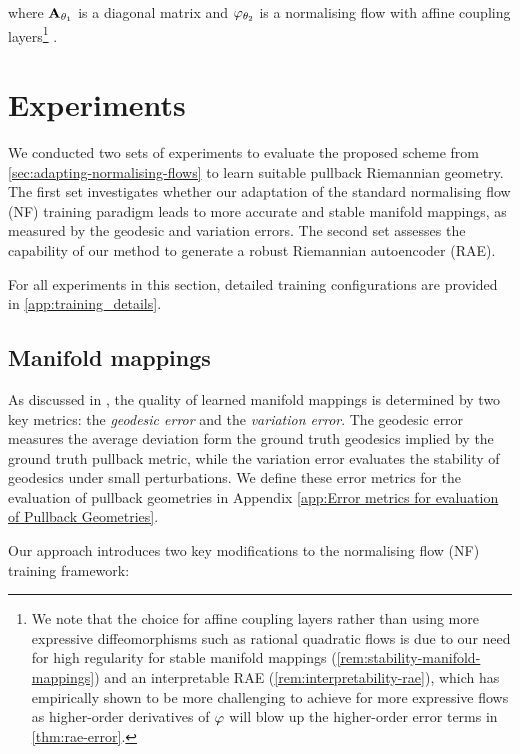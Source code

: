 where $\mathbf{A}_{\theta_1}$ is a diagonal matrix and $\varphi_{\theta_2}$ is a normalising flow with affine coupling layers\footnote{We note that the choice for affine coupling layers rather than using more expressive diffeomorphisms such as rational quadratic flows \cite{durkan2019neural} is due to our need for high regularity for stable manifold mappings (\ref{rem:stability-manifold-mappings}) and an interpretable RAE (\ref{rem:interpretability-rae}), which has empirically shown to be more challenging to achieve for more expressive flows as higher-order derivatives of $\varphi$ will blow up the higher-order error terms in \ref{thm:rae-error}.} \cite{dinh2017density}.


\section{Experiments}
\label{sec:numerics}

We conducted two sets of experiments to evaluate the proposed scheme from \ref{sec:adapting-normalising-flows} to learn suitable pullback Riemannian geometry. The first set investigates whether our adaptation of the standard normalising flow (NF) training paradigm leads to more accurate and stable manifold mappings, as measured by the geodesic and variation errors. The second set assesses the capability of our method to generate a robust Riemannian autoencoder (RAE).

For all experiments in this section, detailed training configurations are provided in \ref{app:training_details}.

\subsection{Manifold mappings}
\label{sec:manifold-mappings-experiments}

As discussed in \cite{diepeveen2024pulling}, the quality of learned manifold mappings is determined by two key metrics: the \emph{geodesic error} and the \emph{variation error}. The geodesic error measures the average deviation form the ground truth geodesics implied by the ground truth pullback metric, while the variation error evaluates the stability of geodesics under small perturbations. We define these error metrics for the evaluation of pullback geometries in Appendix \ref{app:Error metrics for evaluation of Pullback Geometries}.

Our approach introduces two key modifications to the normalising flow (NF) training framework:

